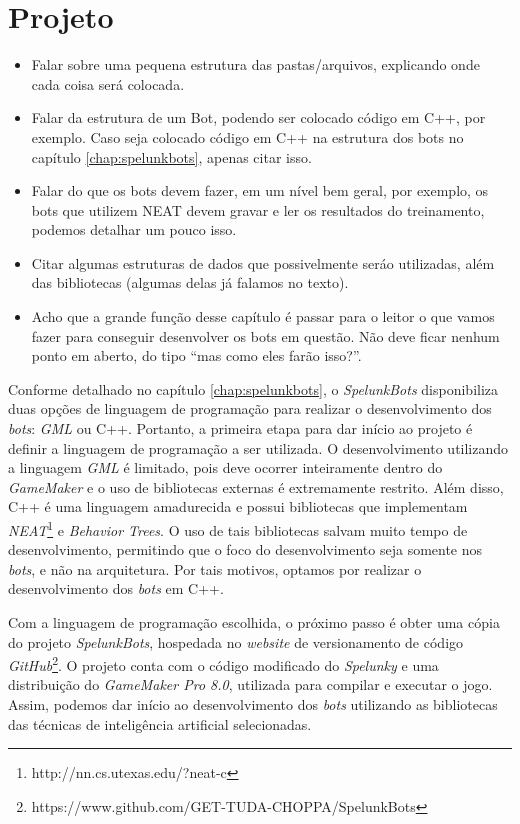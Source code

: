 \chapter{\label{chap:project}Projeto} 
\begin{mdframed}[backgroundcolor=green!20]
\begin{itemize}
    \item
        Falar sobre uma pequena estrutura das pastas/arquivos, explicando onde
        cada coisa será colocada.
    \item
        Falar da estrutura de um Bot, podendo ser colocado código em C++,
        por exemplo. Caso seja colocado código em C++ na estrutura dos bots
        no capítulo \ref{chap:spelunkbots}, apenas citar isso.
    \item
        Falar do que os bots devem fazer, em um nível bem geral, por exemplo, os
        bots que utilizem NEAT devem gravar e ler os resultados do treinamento,
        podemos detalhar um pouco isso.
    \item
        Citar algumas estruturas de dados que possivelmente seráo utilizadas,
        além das bibliotecas (algumas delas já falamos no texto).
    \item
        Acho que a grande função desse capítulo é passar para o leitor o
        que vamos fazer para conseguir desenvolver os bots em questão. Não deve
        ficar nenhum ponto em aberto, do tipo ``mas como eles farão isso?''.
\end{itemize}
\end{mdframed}
Conforme detalhado no capítulo \ref{chap:spelunkbots}, o \textit{SpelunkBots}
disponibiliza duas opções de linguagem de programação para realizar o
desenvolvimento dos \textit{bots}: \textit{GML} ou C++. Portanto, a primeira
etapa para dar início ao projeto é definir a linguagem de programação a ser
utilizada. O desenvolvimento utilizando a linguagem \textit{GML} é limitado,
pois deve ocorrer inteiramente dentro do \textit{GameMaker} e o uso de
bibliotecas externas é extremamente restrito. Além disso, C++ é uma linguagem
amadurecida e possui bibliotecas que implementam
\textit{NEAT}\footnote{http://nn.cs.utexas.edu/?neat-c} e \textit{Behavior
Trees}. O uso de tais bibliotecas salvam muito tempo de desenvolvimento,
permitindo que o foco do desenvolvimento seja somente nos \textit{bots}, e não
na arquitetura. Por tais motivos, optamos por realizar o desenvolvimento dos
\textit{bots} em C++.

Com a linguagem de programação escolhida, o próximo passo é obter uma cópia do
projeto \textit{SpelunkBots}, hospedada no \textit{website} de versionamento de
código
\textit{GitHub}\footnote{https://www.github.com/GET-TUDA-CHOPPA/SpelunkBots}. O
projeto conta com o código modificado do \textit{Spelunky} e uma distribuição do
\textit{GameMaker Pro 8.0}, utilizada para compilar e executar o jogo. Assim,
podemos dar início ao desenvolvimento dos \textit{bots} utilizando as bibliotecas
das técnicas de inteligência artificial selecionadas.

